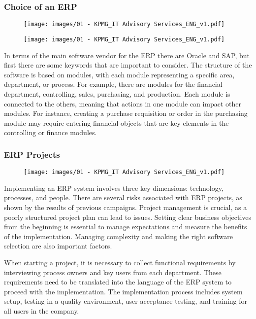 \subsubsection{Choice of an ERP}
\begin{figure}[!h]
  \centering
  \texttt{[image: images/01 - KPMG\_IT Advisory Services\_ENG\_v1.pdf]}
\end{figure}

\begin{figure}[!h]
  \centering
  \texttt{[image: images/01 - KPMG\_IT Advisory Services\_ENG\_v1.pdf]}
\end{figure}

In terms of the main software vendor for the ERP there are Oracle and SAP, but first there are some keywords that are important to consider. The structure of the
software is based on modules, with each module representing a specific
area, department, or process. For example, there are modules for the
financial department, controlling, sales, purchasing, and production.
Each module is connected to the others, meaning that actions in one module
can impact other modules. For instance, creating a purchase requisition
or order in the purchasing module may require entering financial objects
that are key elements in the controlling or finance modules.

\subsubsection{ERP Projects}

\begin{figure}[!h]
  \centering
  \texttt{[image: images/01 - KPMG\_IT Advisory Services\_ENG\_v1.pdf]}
\end{figure}

Implementing an ERP system involves three key dimensions: technology,
processes, and people. There are several risks associated with ERP
projects, as shown by the results of previous campaigns. Project
management is crucial, as a poorly structured project plan can lead to
issues. Setting clear business objectives from the beginning is
essential to manage expectations and measure the benefits of the
implementation. Managing complexity and making the right software
selection are also important factors.

When starting a project, it is necessary to collect functional
requirements by interviewing process owners and key users from each
department. These requirements need to be translated into the language
of the ERP system to proceed with the implementation. The implementation
process includes system setup, testing in a quality environment, user
acceptance testing, and training for all users in the company.

